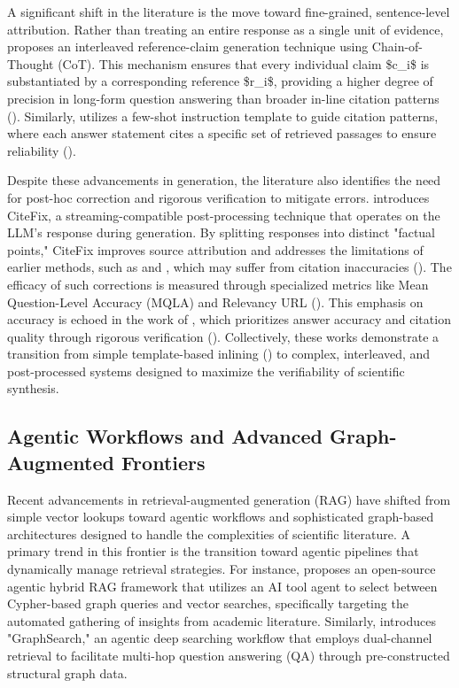 \documentclass[11pt]{article}
\begin{document}
A significant shift in the literature is the move toward fine-grained, sentence-level attribution. Rather than treating an entire response as a single unit of evidence, \citep{2407.01796} proposes an interleaved reference-claim generation technique using Chain-of-Thought (CoT). This mechanism ensures that every individual claim \$c\_i\$ is substantiated by a corresponding reference \$r\_i\$, providing a higher degree of precision in long-form question answering than broader in-line citation patterns (\citep{2407.01796}). Similarly, \citep{2510.11394} utilizes a few-shot instruction template to guide citation patterns, where each answer statement cites a specific set of retrieved passages to ensure reliability (\citep{2510.11394}).

Despite these advancements in generation, the literature also identifies the need for post-hoc correction and rigorous verification to mitigate errors. \citep{2504.15629} introduces CiteFix, a streaming-compatible post-processing technique that operates on the LLM's response during generation. By splitting responses into distinct "factual points," CiteFix improves source attribution and addresses the limitations of earlier methods, such as \citep{2305.14627} and \citep{1904.09675}, which may suffer from citation inaccuracies (\citep{2504.15629}). The efficacy of such corrections is measured through specialized metrics like Mean Question-Level Accuracy (MQLA) and Relevancy URL (\citep{2504.15629}). This emphasis on accuracy is echoed in the work of \citep{2510.11394}, which prioritizes answer accuracy and citation quality through rigorous verification (\citep{2510.11394}). Collectively, these works demonstrate a transition from simple template-based inlining (\citep{2203.11147}) to complex, interleaved, and post-processed systems designed to maximize the verifiability of scientific synthesis.

\subsection{Agentic Workflows and Advanced Graph-Augmented Frontiers}

Recent advancements in retrieval-augmented generation (RAG) have shifted from simple vector lookups toward agentic workflows and sophisticated graph-based architectures designed to handle the complexities of scientific literature. A primary trend in this frontier is the transition toward agentic pipelines that dynamically manage retrieval strategies. For instance, \citep{2508.05660} proposes an open-source agentic hybrid RAG framework that utilizes an AI tool agent to select between Cypher-based graph queries and vector searches, specifically targeting the automated gathering of insights from academic literature. Similarly, \citep{2509.22009} introduces "GraphSearch," an agentic deep searching workflow that employs dual-channel retrieval to facilitate multi-hop question answering (QA) through pre-constructed structural graph data.
\end{document}
